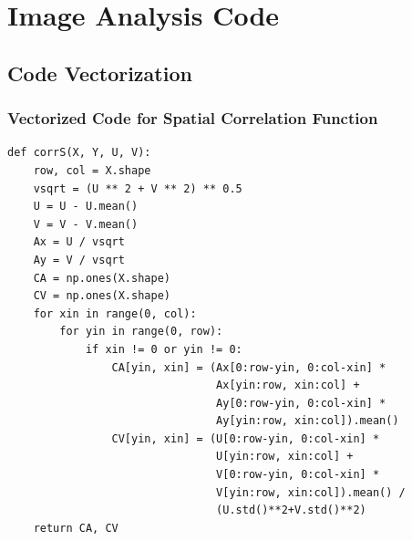 \chapter{Image Analysis Code}

\section{Code Vectorization}
\label{sec:A-vectorization}
\subsection{Vectorized Code for Spatial Correlation Function}
\begin{verbatim}
def corrS(X, Y, U, V):
    row, col = X.shape
    vsqrt = (U ** 2 + V ** 2) ** 0.5
    U = U - U.mean()
    V = V - V.mean()
    Ax = U / vsqrt
    Ay = V / vsqrt
    CA = np.ones(X.shape)
    CV = np.ones(X.shape)
    for xin in range(0, col):
        for yin in range(0, row):
            if xin != 0 or yin != 0:
                CA[yin, xin] = (Ax[0:row-yin, 0:col-xin] *
                                Ax[yin:row, xin:col] +
                                Ay[0:row-yin, 0:col-xin] *
                                Ay[yin:row, xin:col]).mean()
                CV[yin, xin] = (U[0:row-yin, 0:col-xin] *
                                U[yin:row, xin:col] +
                                V[0:row-yin, 0:col-xin] *
                                V[yin:row, xin:col]).mean() /
                                (U.std()**2+V.std()**2)
    return CA, CV
\end{verbatim}

